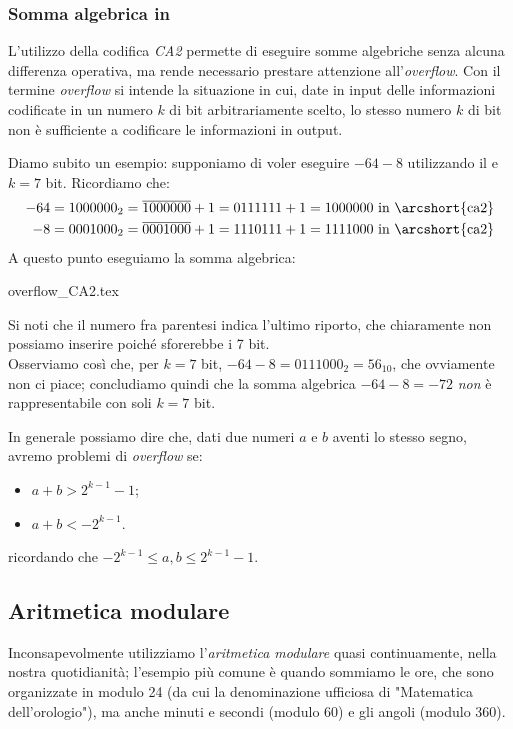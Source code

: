 \documentclass[class=book, crop=false, oneside]{standalone}
\begin{document}
\subsubsection{Somma algebrica in }
L'utilizzo della codifica \emph{CA2} permette di eseguire somme algebriche senza alcuna differenza operativa, ma rende necessario prestare attenzione all'\emph{overflow}. Con il termine \emph{overflow} si intende la situazione in cui, date in input delle informazioni codificate in un numero \(k\) di bit arbitrariamente scelto, lo stesso numero \(k\) di bit non è sufficiente a codificare le informazioni in output.

Diamo subito un esempio: supponiamo di voler eseguire \(-64-8\) utilizzando il  e \(k=7\) bit. Ricordiamo che:
\begin{align*}
-64=1000000_{2}=\overline{1000000}+1=0111111+1=1000000 \text{ in \arcshort{ca2}}\\
-8=0001000_{2}=\overline{0001000}+1=1110111+1=1111000 \text{ in \arcshort{ca2}}
\end{align*}
A questo punto eseguiamo la somma algebrica:
\begin{table}[H]
	\centering
	{overflow_CA2.tex}
\end{table}
Si noti che il numero fra parentesi indica l'ultimo riporto, che chiaramente non possiamo inserire poiché sforerebbe i 7 bit.\\
Osserviamo così che, per \(k=7\) bit, \(-64-8=0111000_{2}=56_{10}\), che ovviamente non ci piace; concludiamo quindi che la somma algebrica \(-64-8=-72\) \emph{non} è rappresentabile con soli \(k=7\) bit.

In generale possiamo dire che, dati due numeri \(a\) e \(b\) aventi lo stesso segno, avremo problemi di \emph{overflow} se:
\begin{itemize}
	\item \(a+b>2^{k-1}-1\);
	\item \(a+b<-2^{k-1}\).
\end{itemize}
ricordando che \(-2^{k-1}\le a,b\le 2^{k-1}-1\).

\subsection{Aritmetica modulare}
Inconsapevolmente utilizziamo l'\emph{aritmetica modulare} quasi continuamente, nella nostra quotidianità; l'esempio più comune è quando sommiamo le ore, che sono organizzate in modulo 24 (da cui la denominazione ufficiosa di "Matematica dell'orologio"), ma anche minuti e secondi (modulo 60) e gli angoli (modulo 360).
\end{document}
